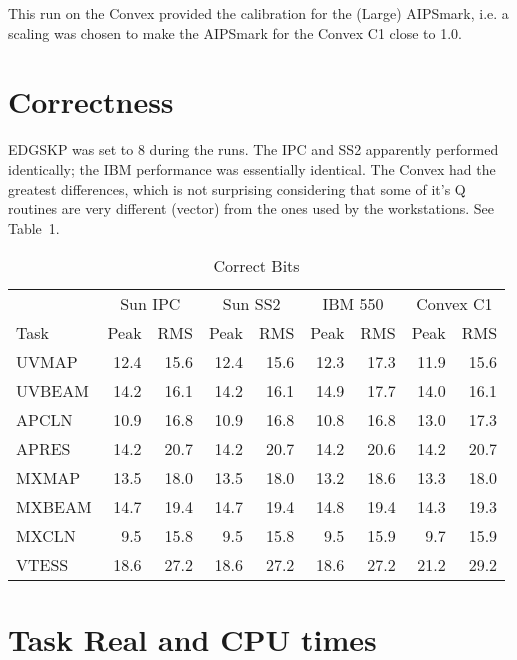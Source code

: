 This run on the Convex provided the calibration for the (Large)
AIPSmark, i.e.  a scaling was chosen to make the AIPSmark for the
Convex C1 close to 1.0.

\section{Correctness}

EDGSKP was set to 8 during the runs.  The IPC and SS2 apparently
performed identically; the IBM performance was essentially identical.
The Convex had the greatest differences, which is not surprising
considering that some of it's Q routines are very different (vector)
from the ones used by the workstations. See Table~1.

\begin{table}[h]
\begin{center}
\begin{tabular}{lrrrrrrrr}
	& \multicolumn{2}{c}{Sun IPC} & \multicolumn{2}{c}{Sun SS2} &
\multicolumn{2}{c}{IBM 550} & \multicolumn{2}{c}{Convex C1} \\
Task	& Peak	& RMS	& Peak	& RMS	& Peak	& RMS & Peak & RMS \\
\hline
UVMAP &     12.4 &   15.6 &   12.4 &   15.6 &   12.3 &   17.3 & 11.9 & 15.6 \\
UVBEAM &    14.2 &   16.1 &   14.2 &   16.1 &   14.9 &   17.7 & 14.0 & 16.1 \\
APCLN &     10.9 &   16.8 &   10.9 &   16.8 &   10.8 &   16.8 & 13.0 & 17.3 \\
APRES &     14.2 &   20.7 &   14.2 &   20.7 &   14.2 &   20.6 & 14.2 & 20.7 \\
MXMAP &     13.5 &   18.0 &   13.5 &   18.0 &   13.2 &   18.6 & 13.3 & 18.0 \\
MXBEAM &    14.7 &   19.4 &   14.7 &   19.4 &   14.8 &   19.4 & 14.3 & 19.3 \\
MXCLN &      9.5 &   15.8 &    9.5 &   15.8 &    9.5 &   15.9 &  9.7 & 15.9 \\
VTESS &     18.6 &   27.2 &   18.6 &   27.2 &   18.6 &   27.2 & 21.2 & 29.2 \\
\end{tabular}
\end{center}
\caption{Correct Bits}
\end{table}

\section{Task Real and CPU times}

